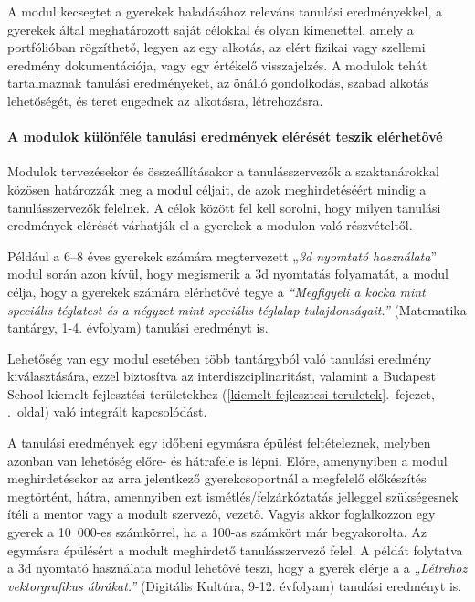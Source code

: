 A modul kecsegtet a gyerekek haladásához releváns tanulási
eredményekkel, a gyerekek által meghatározott saját célokkal és olyan
kimenettel, amely a portfólióban rögzíthető, legyen az egy alkotás, az
elért fizikai vagy szellemi eredmény dokumentációja, vagy egy értékelő
visszajelzés. A modulok tehát tartalmaznak tanulási eredményeket, az
önálló gondolkodás, szabad alkotás lehetőségét, és teret engednek az
alkotásra, létrehozásra.

\hypertarget{a-modulok-kulonfele-tanulasi-eredmenyek-elereset-teszik-elerhetove}{%
\paragraph{A modulok különféle tanulási eredmények elérését teszik
elérhetővé}\label{a-modulok-kulonfele-tanulasi-eredmenyek-elereset-teszik-elerhetove}}

Modulok tervezésekor és összeállításakor a tanulásszervezők a
szaktanárokkal közösen határozzák meg a modul céljait, de azok
meghirdetéséért mindig a tanulásszervezők felelnek. A célok között fel
kell sorolni, hogy milyen tanulási eredmények elérését várhatják el a
gyerekek a modulon való részvételtől.

Például a 6--8 éves gyerekek számára megtervezett „\emph{3d nyomtató
használata}'' modul során azon kívül, hogy megismerik a 3d nyomtatás
folyamatát, a modul célja, hogy a gyerekek számára elérhetővé tegye a
\emph{``Megfigyeli a kocka mint speciális téglatest és a négyzet mint
speciális téglalap tulajdonságait.''} (Matematika tantárgy, 1-4.
évfolyam) tanulási eredményt is.

Lehetőség van egy modul esetében több tantárgyból való tanulási eredmény
kiválasztására, ezzel biztosítva az interdiszciplinaritást, valamint a
Budapest School
kiemelt fejlesztési területekhez (\ref{kiemelt-fejlesztesi-teruletek}.~fejezet, \pageref{kiemelt-fejlesztesi-teruletek}.~oldal)
való integrált kapcsolódást.

A tanulási eredmények egy időbeni egymásra épülést feltételeznek,
melyben azonban van lehetőség előre- és hátrafele is lépni. Előre,
amenynyiben a modul meghirdetésekor az arra jelentkező gyerekcsoportnál
a megfelelő előkészítés megtörtént, hátra, amennyiben ezt
ismétlés/felzárkóztatás jelleggel szükségesnek ítéli a mentor vagy a
modult szervező, vezető. Vagyis akkor foglalkozzon egy gyerek a
10~000-es számkörrel, ha a 100-as számkört már begyakorolta. Az egymásra
épülésért a modult meghirdető tanulásszervező felel. A példát folytatva
a 3d nyomtató használata modul lehetővé teszi, hogy a gyerek elérje a a
\emph{„Létrehoz vektorgrafikus ábrákat.''} (Digitális Kultúra, 9-12.
évfolyam) tanulási eredményt is.


